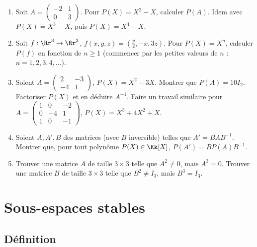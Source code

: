 \documentclass[12pt, class=report,crop=false]{standalone}
\begin{document}
\begin{miniexercices}
\sauteligne
\begin{enumerate}
  \item Soit $A = \left(\begin{smallmatrix}-2&1\\0&3\end{smallmatrix}\right)$.
  Pour $P(X) =  X^2-X$, calculer $P(A)$. Idem avec $P(X) =  X^3-X$, puis  $P(X) =  X^4-X$.
  
  \item Soit $f : \Rr^3 \to \Rr^3$, $f(x,y,z) = (\frac y2, -x, 3z)$.
  Pour $P(X) = X^n$, calculer $P(f)$ en fonction de $n\ge1$ (commencer par les petites valeurs de $n$ : $n=1,2,3,4,\ldots$).

  \item Soient $A = 
  \left(\begin{smallmatrix}
  2 & -3 \\
  -4 & 1  
  \end{smallmatrix}\right)$, $P(X)=X^2-3X$.
  Montrer que $P(A)=10 I_2$. Factoriser $P(X)$ et en déduire $A^{-1}$. 
  Faire un travail similaire pour $A = 
  \left(\begin{smallmatrix}
  1 & 0 & -2 \\
0 & -4 & 1 \\
1 & 0 & -1\end{smallmatrix}\right)$, $P(X)=X^3+4X^2+X$.
  
  \item Soient $A,A',B$ des matrices (avec $B$ inversible) telles que $A' = B A B^{-1}$.
Montrer que, pour tout polynôme $P(X) \in \Kk[X]$, $P(A') = B P(A) B^{-1}$.
  
  \item Trouver une matrice $A$ de taille $3\times 3$ telle que $A^2\neq 0$, mais $A^3 = 0$. Trouver une matrice $B$ de taille $3\times 3$ telle que $B^2 \neq I_3$, mais $B^3 = I_3$.
\end{enumerate}
\end{miniexercices}




\section{Sous-espaces stables}


\subsection{Définition}
\end{document}
